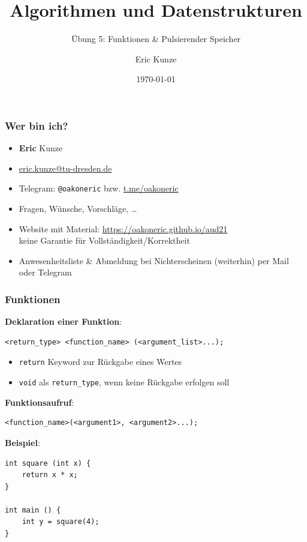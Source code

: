 \documentclass{beamer}
\begin{document}
	
	\title{Algorithmen und Datenstrukturen}
	\subtitle{Übung 5: Funktionen \& Pulsierender Speicher}
	\author{Eric Kunze}
	\date{\today}

	\maketitle



\begin{frame} \frametitle{Wer bin ich?}
	\begin{itemize}
		\item \textbf{Eric} \textcolor{cdgray!50}{Kunze}
		\item \url{eric.kunze@tu-dresden.de}
		\item Telegram: \texttt{@oakoneric} bzw. \url{t.me/oakoneric}
		\item Fragen, Wünsche, Vorschläge, \dots 
		\item Website mit Material: \url{https://oakoneric.github.io/aud21} \\
		keine Garantie für Vollständigkeit/Korrektheit
		\item Anwesenheitsliste \& Abmeldung bei Nichterscheinen (weiterhin) per Mail oder Telegram
	\end{itemize}	
\end{frame}

\begin{frame}[fragile] \frametitle{Funktionen}
	\small
	\textbf{Deklaration einer Funktion}:
	\begin{lstlisting}[style=example]
<return_type> <function_name> (<argument_list>...);
	\end{lstlisting}
	\begin{itemize}
		\item \lstinline|return| Keyword zur Rückgabe eines Wertes
		\item \lstinline|void| als \lstinline|return_type|, wenn keine Rückgabe erfolgen soll
	\end{itemize}
	
	\textbf{Funktionsaufruf}:
	\begin{lstlisting}[style=example]
<function_name>(<argument1>, <argument2>...);
	\end{lstlisting}
	
	\textbf{Beispiel}:
	\begin{lstlisting}[style=example]
int square (int x) {
	return x * x;
}

int main () {
	int y = square(4);
}
	\end{lstlisting}
\end{frame}
\end{document}
